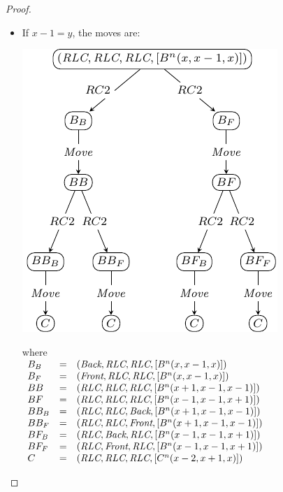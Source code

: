 \begin{proof}
\begin{itemize}[parsep=0cm, itemsep=0cm, topsep=0cm]
\item If $x-1=y$, the moves are:
	\begin{center}
	\includegraphics[scale=1]{figures/figBx+2y-1}
	\end{center}
	where\\
$\begin{array}{l c l}
	B_B & = &(\Back, \RLC, \RLC, [B^n(x, x-1, x)])\\
	B_F & = &(\Front, \RLC, \RLC, [B^n(x, x-1, x)])\\
	BB & = &(\RLC, \RLC, \RLC, [B^n(x+1, x-1, x-1)])\\
	BF & = &(\RLC, \RLC, \RLC, [B^n(x-1, x-1, x+1)])\\
		BB_B & = &(\RLC, \RLC, \Back, [B^n(x+1, x-1, x-1)])\\
		BB_F& = &(\RLC, \RLC, \Front, [B^n(x+1, x-1, x-1)])\\
		BF_B & = &(\RLC, \Back, \RLC, [B^n(x-1, x-1, x+1)])\\
		BF_F& = &(\RLC, \Front, \RLC, [B^n(x-1, x-1, x+1)])\\%
	C & = &(\RLC, \RLC, \RLC, [C^n(x-2, x+1, x)])\\
\end{array}$


\end{itemize}
\end{proof}
